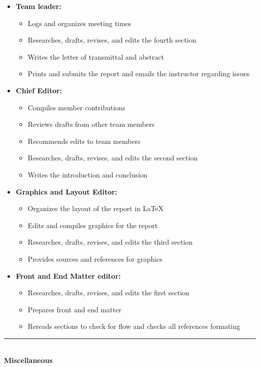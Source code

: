 \documentclass{article}
\begin{document}
	\begin{itemize}
		\item \textbf{Team leader: }
		\begin{itemize}
			\item Logs and organizes meeting times
			\item Researches, drafts, revises, and edits the fourth section
			\item Writes the letter of transmittal and abstract
			\item Prints and submits the report and emails the instructor regarding issues
		\end{itemize}
		\item \textbf{Chief Editor: }
		\begin{itemize}
			\item Compiles member contributions
			\item Reviews drafts from other team members
			\item Recommends edits to team members
			\item Researches, drafts, revises, and edits the second section
			\item Writes the introduction and conclusion
		\end{itemize}
		\pagebreak
		\item \textbf{Graphics and Layout Editor: }
		\begin{itemize}
			\item Organizes the layout of the report in \LaTeX
			\item Edits and compiles graphics for the report
			\item Researches, drafts, revises, and edits the third section
			\item Provides sources and references for graphics 
		\end{itemize}
		\item \textbf{Front and End Matter editor: }
		\begin{itemize}
			\item Researches, drafts, revises, and edits the first section 
			\item Prepares front and end matter
			\item Rereads sections to check for flow and checks all references formating
		\end{itemize}
	\end{itemize} 

	\noindent\rule{\textwidth}{0.4pt} \\
	\noindent\textbf{Miscellaneous} 
\end{document}
